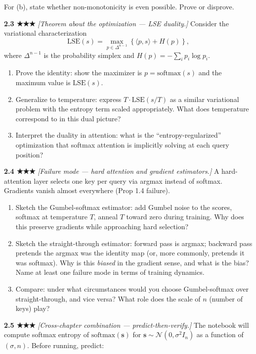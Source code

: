 \documentclass[
]{article}
\begin{document}
For (b), state whether non-monotonicity is even possible. Prove or
disprove.

\textbf{2.3 ★★★} \emph{{[}Theorem about the optimization --- LSE
duality.{]}} Consider the variational characterization
\[\text{LSE}(s) = \max_{p \in \Delta^{n-1}} \left\{ \langle p, s \rangle + H(p) \right\},\]
where \(\Delta^{n-1}\) is the probability simplex and
\(H(p) = -\sum_i p_i \log p_i\).

\begin{enumerate}
\def\labelenumi{(\alph{enumi})}
\item
  Prove the identity: show the maximizer is \(p = \text{softmax}(s)\)
  and the maximum value is \(\text{LSE}(s)\).
\item
  Generalize to temperature: express \(T \cdot \text{LSE}(s/T)\) as a
  similar variational problem with the entropy term scaled
  appropriately. What does temperature correspond to in this dual
  picture?
\item
  Interpret the duality in attention: what is the
  ``entropy-regularized'' optimization that softmax attention is
  implicitly solving at each query position?
\end{enumerate}

\textbf{2.4 ★★★} \emph{{[}Failure mode --- hard attention and gradient
estimators.{]}} A hard-attention layer selects one key per query via
argmax instead of softmax. Gradients vanish almost everywhere (Prop 1.4
failure).

\begin{enumerate}
\def\labelenumi{(\alph{enumi})}
\item
  Sketch the Gumbel-softmax estimator: add Gumbel noise to the scores,
  softmax at temperature \(T\), anneal \(T\) toward zero during
  training. Why does this preserve gradients while approaching hard
  selection?
\item
  Sketch the straight-through estimator: forward pass is argmax;
  backward pass pretends the argmax was the identity map (or, more
  commonly, pretends it was softmax). Why is this \emph{biased} in the
  gradient sense, and what is the bias? Name at least one failure mode
  in terms of training dynamics.
\item
  Compare: under what circumstances would you choose Gumbel-softmax over
  straight-through, and vice versa? What role does the scale of \(n\)
  (number of keys) play?
\end{enumerate}

\textbf{2.5 ★★★} \emph{{[}Cross-chapter combination ---
predict-then-verify.{]}} The notebook will compute softmax entropy of
\(\text{softmax}(\mathbf{s})\) for
\(\mathbf{s} \sim \mathcal{N}(0, \sigma^2 I_n)\) as a function of
\((\sigma, n)\). Before running, predict:
\end{document}
